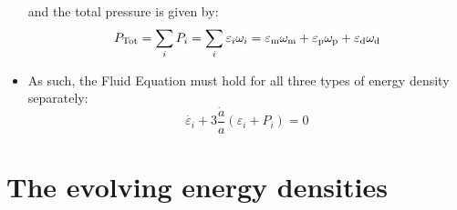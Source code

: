 \documentclass[11pt]{article}
\newcommand{\vep}[1]{\ensuremath{\varepsilon#1}}
\begin{document}
\begin{itemize}
\begin{equation}
\end{equation} 
and the total pressure is given by:
\begin{equation}
    P_{\rm Tot} = \sum_i P_{i} = \sum_i\vep{_i}\omega_i = \vep{_{\rm m}}\omega_{\rm m} + \vep{_{\rm p}}\omega_{\rm p} + \vep{_{\rm d}}\omega_{\rm d}
\end{equation} 
\item As such, the Fluid Equation must hold for all three types of energy density separately:
\begin{equation}
\dot{\vep{_i}} + 3\frac{\dot{a}}{a}(\vep{_i} + P_i) = 0
\end{equation}
\end{itemize}

\section{The evolving energy densities}
\end{document}
